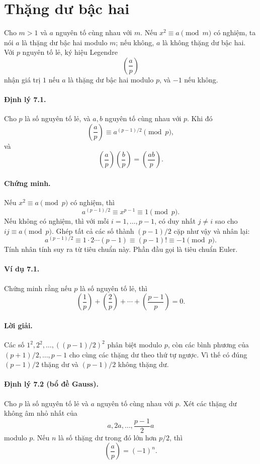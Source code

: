 \documentclass[11pt]{article}
\newcommand{\leg}[2]{\left(\frac{#1}{#2}\right)}
\begin{document}
\section{Thặng dư bậc hai}

Cho \(m>1\) và \(a\) nguyên tố cùng nhau với \(m\). Nếu \(x^2\equiv a\pmod m\)
có nghiệm, ta nói \(a\) là thặng dư bậc hai modulo \(m\); nếu không, \(a\) là
không thặng dư bậc hai. Với \(p\) nguyên tố lẻ, ký hiệu Legendre
\[
 \leg ap
\]
nhận giá trị \(1\) nếu \(a\) là thặng dư bậc hai modulo \(p\), và \(-1\) nếu
không.

\paragraph{Định lý 7.1.}
Cho \(p\) là số nguyên tố lẻ, và \(a,b\) nguyên tố cùng nhau với \(p\). Khi đó
\[
 \leg ap\equiv a^{(p-1)/2}\pmod p,
\]
và
\[
 \leg ap\leg bp=\leg{ab}p.
\]

\paragraph{Chứng minh.}
Nếu \(x^2\equiv a\pmod p\) có nghiệm, thì
\[
 a^{(p-1)/2}\equiv x^{p-1}\equiv1\pmod p.
\]
Nếu không có nghiệm, thì với mỗi \(i=1,\ldots,p-1\), có duy nhất \(j\ne i\)
sao cho \(ij\equiv a\pmod p\). Ghép tất cả các số thành \((p-1)/2\) cặp như
vậy và nhân lại:
\[
 a^{(p-1)/2}\equiv1\cdot2\cdots(p-1)\equiv(p-1)!\equiv-1\pmod p.
\]
Tính nhân tính suy ra từ tiêu chuẩn này. Phần đầu gọi là tiêu chuẩn Euler.

\paragraph{Ví dụ 7.1.}
Chứng minh rằng nếu \(p\) là số nguyên tố lẻ, thì
\[
 \leg1p+\leg2p+\cdots+\leg{p-1}p=0.
\]

\paragraph{Lời giải.}
Các số \(1^2,2^2,\ldots,((p-1)/2)^2\) phân biệt modulo \(p\), còn các bình
phương của \((p+1)/2,\ldots,p-1\) cho cùng các thặng dư theo thứ tự ngược. Vì
thế có đúng \((p-1)/2\) thặng dư và \((p-1)/2\) không thặng dư.

\paragraph{Định lý 7.2 (bổ đề Gauss).}
Cho \(p\) là số nguyên tố lẻ và \(a\) nguyên tố cùng nhau với \(p\). Xét các
thặng dư không âm nhỏ nhất của
\[
 a,2a,\ldots,\frac{p-1}{2}a
\]
modulo \(p\). Nếu \(n\) là số thặng dư trong đó lớn hơn \(p/2\), thì
\[
 \leg ap=(-1)^n.
\]
\end{document}
